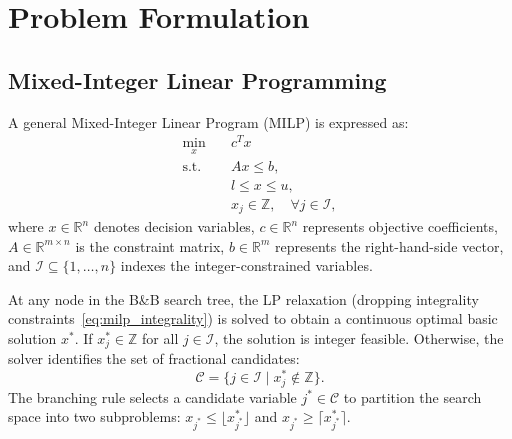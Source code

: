 \documentclass[10pt,twocolumn,letterpaper]{article}
\theoremstyle{plain}
\theoremstyle{definition}
\theoremstyle{remark}
\begin{document}
\section{Problem Formulation}
\label{sec:formulation}

\subsection{Mixed-Integer Linear Programming}
A general Mixed-Integer Linear Program (MILP) is expressed as:
\begin{align}
    \min_{x} \quad & c^T x \label{eq:milp_obj} \\
    \text{s.t.} \quad & A x \le b, \label{eq:milp_cons} \\
    & l \le x \le u, \label{eq:milp_bounds} \\
    & x_j \in \mathbb{Z}, \quad \forall j \in \mathcal{I}, \label{eq:milp_integrality}
\end{align}
where $x \in \mathbb{R}^n$ denotes decision variables, $c \in \mathbb{R}^n$ represents objective coefficients, $A \in \mathbb{R}^{m \times n}$ is the constraint matrix, $b \in \mathbb{R}^m$ represents the right-hand-side vector, and $\mathcal{I} \subseteq \{1, \dots, n\}$ indexes the integer-constrained variables.

At any node in the B\&B search tree, the LP relaxation (dropping integrality constraints~\eqref{eq:milp_integrality}) is solved to obtain a continuous optimal basic solution $x^*$. If $x_j^* \in \mathbb{Z}$ for all $j \in \mathcal{I}$, the solution is integer feasible. Otherwise, the solver identifies the set of fractional candidates:
\begin{equation}
    \mathcal{C} = \{j \in \mathcal{I} \mid x_j^* \notin \mathbb{Z}\}.
\end{equation}
The branching rule selects a candidate variable $j^* \in \mathcal{C}$ to partition the search space into two subproblems: $x_{j^*} \le \lfloor x_{j^*}^* \rfloor$ and $x_{j^*} \ge \lceil x_{j^*}^* \rceil$.
\end{document}
